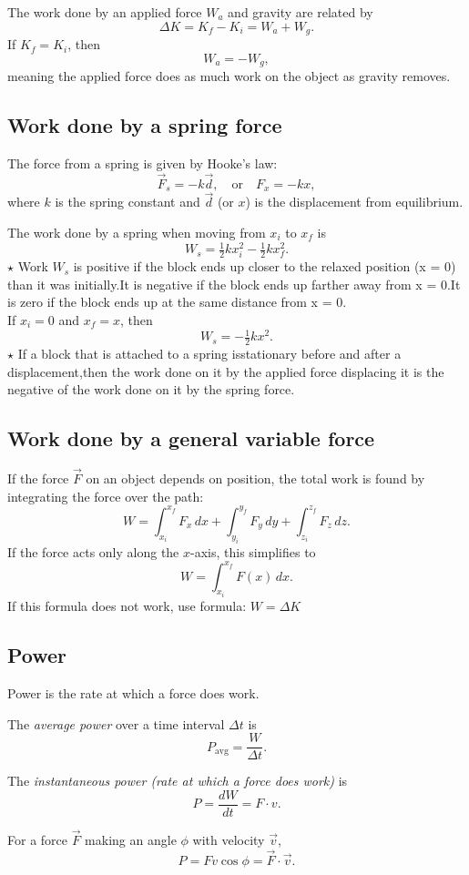 The work done by an applied force $W_a$ and gravity are related by
\[
\Delta K = K_f - K_i = W_a + W_g.
\]
If $K_f = K_i$, then
\[
W_a = -W_g,
\]
meaning the applied force does as much work on the object as gravity removes.

\subsection{Work done by a spring force}

The force from a spring is given by Hooke's law:
\[
\vec{F}_s = -k\vec{d}, \quad \text{or} \quad F_x = -kx,
\]
where $k$ is the spring constant and $\vec{d}$ (or $x$) is the displacement from equilibrium.

The work done by a spring when moving from $x_i$ to $x_f$ is
\[
W_s = \tfrac{1}{2}k x_i^2 - \tfrac{1}{2}k x_f^2.
\]
$\star$ Work $W_s$
is positive if the block ends up closer to the relaxed position (x = 0) than
it was initially.It is negative if the block ends up farther away from x = 0.It is zero
if the block ends up at the same distance from x = 0.\\

If $x_i = 0$ and $x_f = x$, then
\[
W_s = -\tfrac{1}{2}kx^2.
\]
$\star$ If a block that is attached to a spring isstationary before and after a displacement,then the work done on it by the applied force displacing it is the negative
of the work done on it by the spring force. \\

\subsection{Work done by a general variable force}

If the force $\vec{F}$ on an object depends on position, the total work is found by integrating the force over the path:
\[
W = \int_{x_i}^{x_f} F_x\,dx + \int_{y_i}^{y_f} F_y\,dy + \int_{z_i}^{z_f} F_z\,dz.
\]
If the force acts only along the $x$-axis, this simplifies to
\[
W = \int_{x_i}^{x_f} F(x)\,dx.
\]
If this formula does not work, use formula: $W = \Delta K$
\\
\subsection{Power}

Power is the rate at which a force does work.

The \textit{average power} over a time interval $\Delta t$ is
\[
P_{\text{avg}} = \frac{W}{\Delta t}.
\]

The \textit{instantaneous power (rate at which a force does work)} is
\[
P = \frac{dW}{dt} = F \cdot v.
\]

For a force $\vec{F}$ making an angle $\phi$ with velocity $\vec{v}$,
\[
P = Fv \cos \phi = \vec{F} \cdot \vec{v}.
\]

